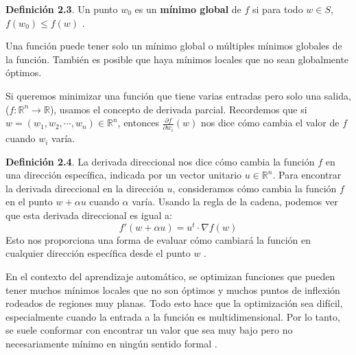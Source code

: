 \textbf{Definición 2.3}. Un punto $w_0$ es un \textbf{mínimo global} de $f$ si para todo $w \in S$,  $f(w_0) \leq f(w)$ . 


Una función puede tener solo un mínimo global o múltiples mínimos globales de la función. También es posible que haya mínimos locales que no sean globalmente óptimos.  

Si queremos minimizar una función que tiene varias entradas pero solo una salida, (\( f : \mathbb{R}^n \to \mathbb{R} \)), usamos el concepto de derivada parcial. Recordemos que si $w = (w_1, w_2, \cdots, w_n) \in \mathbb{R}^n$, entonces \(\frac{\partial f}{\partial w_i}(w)\) nos dice cómo cambia el valor de \(f\) cuando \(w_i\) varía. 

\textbf{Definición 2.4}. La derivada direccional nos dice cómo cambia la función \( f \) en una dirección específica, indicada por un vector unitario \(u \in \mathbb{R}^n\). Para encontrar la derivada direccional en la dirección \(u\), consideramos cómo cambia la función \( f \) en el punto \(w + \alpha u\) cuando \(\alpha\) varía. Usando la regla de la cadena, podemos ver que esta derivada direccional es igual a:
\begin{equation}
    f'(w + \alpha u) = u^t \cdot \nabla f(w)
\end{equation}
Esto nos proporciona una forma de evaluar cómo cambiará la función en cualquier dirección específica desde el punto $w$ \citep{pajares2021aprendizaje}.


En el contexto del aprendizaje automático, se optimizan funciones que pueden tener muchos mínimos locales que no son óptimos y muchos puntos de inflexión rodeados de regiones muy planas. Todo esto hace que la optimización sea difícil, especialmente cuando la entrada a la función es multidimensional. Por lo tanto, se suele conformar con encontrar un valor que sea muy bajo pero no necesariamente mínimo en ningún sentido formal \citep{pajares2021aprendizaje}.

